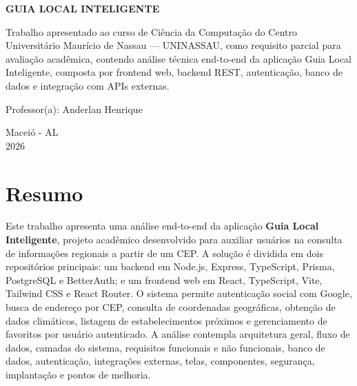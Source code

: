 \documentclass[
    12pt,
    oneside,
    openright,
    a4paper,
    english,
    brazil
]{abntex2}
\begin{document}
\begin{capa}
\begin{center}

\vspace{4cm}

{\Large \textbf{GUIA LOCAL INTELIGENTE}}

\vspace{4cm}

\begin{flushright}
\begin{minipage}{0.52\textwidth}
Trabalho apresentado ao curso de Ciência da Computação do Centro Universitário Maurício de Nassau — UNINASSAU, como requisito parcial para avaliação acadêmica, contendo análise técnica end-to-end da aplicação Guia Local Inteligente, composta por frontend web, backend REST, autenticação, banco de dados e integração com APIs externas.

\vspace{1cm}

Professor(a): Anderlan Henrique
\end{minipage}
\end{flushright}

\vfill

Maceió - AL\\
2026

\end{center}
\end{capa}


\chapter*{Resumo}

Este trabalho apresenta uma análise end-to-end da aplicação \textbf{Guia Local Inteligente}, projeto acadêmico desenvolvido para auxiliar usuários na consulta de informações regionais a partir de um CEP. A solução é dividida em dois repositórios principais: um backend em Node.js, Express, TypeScript, Prisma, PostgreSQL e BetterAuth; e um frontend web em React, TypeScript, Vite, Tailwind CSS e React Router. O sistema permite autenticação social com Google, busca de endereço por CEP, consulta de coordenadas geográficas, obtenção de dados climáticos, listagem de estabelecimentos próximos e gerenciamento de favoritos por usuário autenticado. A análise contempla arquitetura geral, fluxo de dados, camadas do sistema, requisitos funcionais e não funcionais, banco de dados, autenticação, integrações externas, telas, componentes, segurança, implantação e pontos de melhoria.
\end{document}
